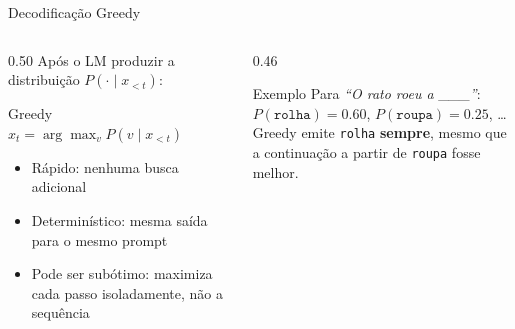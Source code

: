 \documentclass[aspectratio=169, xcolor=dvipsnames]{beamer}
\begin{document}
  \begin{frame}{Decodificação Greedy}
    \begin{columns}[T]
      \begin{column}{0.50\textwidth}
        Após o LM produzir a distribuição $P(\cdot \mid x_{<t})$:
        \begin{block}{Greedy}
          $x_t = \arg\max_v P(v \mid x_{<t})$
        \end{block}
        \vspace{0.3em}
        \begin{itemize}
          \item Rápido: nenhuma busca adicional
          \item Determinístico: mesma saída para o mesmo prompt
          \item Pode ser subótimo: maximiza cada passo isoladamente, não a sequência
        \end{itemize}
      \end{column}
      \begin{column}{0.46\textwidth}
        \begin{exampleblock}{Exemplo}
          Para \textit{``O rato roeu a \_\_\_''}:\\[0.2em]
          $P(\texttt{rolha}) = 0.60$, $P(\texttt{roupa}) = 0.25$, \ldots\\[0.2em]
          Greedy emite \texttt{rolha} \textbf{sempre}, mesmo que a continuação a partir de \texttt{roupa} fosse melhor.
        \end{exampleblock}
      \end{column}
    \end{columns}
  \end{frame}
\end{document}
